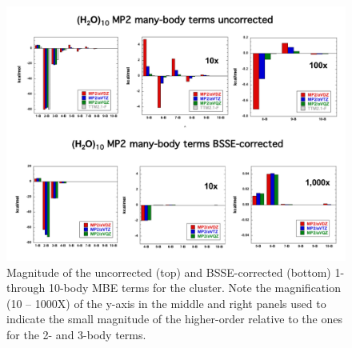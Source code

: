 \begin{figure}[h]
\uwsinglespace
\centering
\includegraphics[width=\textwidth]{Figures/Chapter_2/W10_MP2_MB.pdf}
\caption[Magnitude of the uncorrected (top) and BSSE-corrected (bottom) 1- through 10-body MBE terms for the  cluster. Note the magnification (10 – 1000X) of the y-axis in the middle and right panels used to indicate the small magnitude of the higher-order relative to the ones for the 2- and 3-body terms.]{Magnitude of the uncorrected (top) and BSSE-corrected (bottom) 1- through 10-body MBE terms for the  cluster. Note the magnification (10 – 1000X) of the y-axis in the middle and right panels used to indicate the small magnitude of the higher-order relative to the ones for the 2- and 3-body terms.}
\label{fig:MBE_I_F2}
\end{figure}